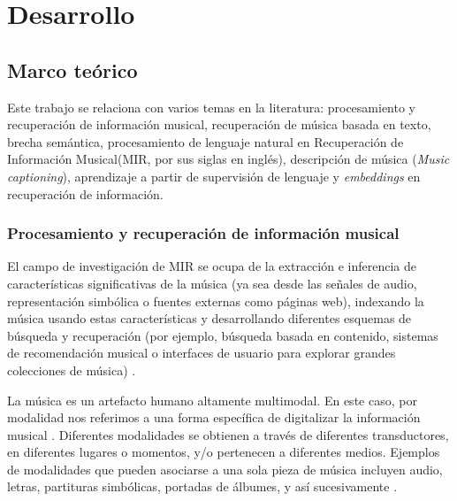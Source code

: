 \chapter{Desarrollo}
\label{chap:development} %

\section{Marco teórico}
\label{sec:sota}  %
Este trabajo se relaciona con varios temas en la literatura: procesamiento y recuperación de información musical, recuperación de música basada en texto, brecha semántica, procesamiento de lenguaje natural en Recuperación de Información Musical(MIR, por sus siglas en inglés), descripción de música (\textit{Music captioning}), aprendizaje a partir de supervisión de lenguaje y \textit{embeddings} en recuperación de información.\\

\subsection{Procesamiento y recuperación de información musical}
\label{subsec:MIR}
El campo de investigación de MIR se ocupa de la extracción e inferencia de características significativas de la música (ya sea desde las señales de audio, representación simbólica o fuentes externas como páginas web), indexando la música usando estas características y desarrollando diferentes esquemas de búsqueda y recuperación (por ejemplo, búsqueda basada en contenido, sistemas de recomendación musical o interfaces de usuario para explorar grandes colecciones de música) \cite{Schedl2014MusicIR}.

La música es un artefacto humano altamente multimodal. En este caso, por modalidad nos referimos a una forma específica de digitalizar la información musical \cite{Simonetta2019MultimodalMI}. Diferentes modalidades se obtienen a través de diferentes transductores, en diferentes lugares o momentos, y/o pertenecen a diferentes medios. Ejemplos de modalidades que pueden asociarse a una sola pieza de música incluyen audio, letras, partituras simbólicas, portadas de álbumes, y así sucesivamente \cite{Simonetta2019MultimodalMI, Schedl2014MusicIR}.

